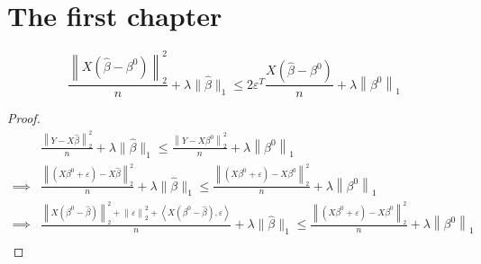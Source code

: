 \chapter{The first chapter}




\begin{lemma}
    $$\frac{\left\|X\left(\hat{\beta}-\beta^{0}\right)\right\|_{2}^{2}}{n} + \lambda\|\hat{\beta}\|_{1} \leq 2 \varepsilon^{T} \frac{X\left(\hat{\beta}-\beta^{0}\right)}{n}+\lambda\left\|\beta^{0}\right\|_{1}$$
\end{lemma}
\begin{proof}
    \begin{align*}
                 & \frac{\left\|Y  - X \hat{\beta} \right\|_{2}^{2}}{n} + \lambda \| \hat{\beta}\|_{1} \leq \frac{\left\| Y  - X \beta^0 \right\|_2^2}{n}+\lambda\left\|\beta^{0}\right\|_{1}                                                   \\
        \implies & \frac{\left\| (X \beta^0  + \varepsilon) - X \hat{\beta} \right\|_{2}^{2}}{n} + \lambda \| \hat{\beta}\|_{1} \leq \frac{\left\| (X \beta^0  + \varepsilon)  - X \beta^0 \right\|_2^2}{n}+\lambda\left\|\beta^{0}\right\|_{1} \\
        \implies & \frac{\left\| X (\beta^0  - \hat{\beta}) \right\|_2^2 + \left\| \varepsilon \right\|_{2}^{2} + \left\langle X (\beta^0  - \hat{\beta}), \varepsilon \right\rangle}{n} + \lambda \| \hat{\beta}\|_{1} \leq \frac{\left\| (X \beta^0  + \varepsilon)  - X \beta^0 \right\|_2^2}{n}+\lambda\left\|\beta^{0}\right\|_{1}   \\
    \end{align*}
\end{proof}
